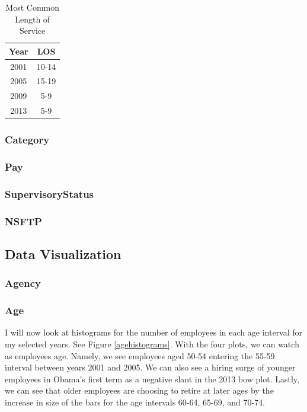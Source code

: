 \documentclass{article}
\begin{document}
            \begin{center}
                \begin{table}
                    \centering
                    \begin{tabular}{ |c|c| }
                        \hline
                        Year & LOS \\
                        \hline
                        2001 & 10-14 \\
                        2005 & 15-19 \\
                        2009 & 5-9 \\
                        2013 & 5-9 \\
                        \hline
                    \end{tabular}
                    \caption{Most Common Length of Service}
                    \label{tab:10}
                \end{table}
            \end{center}

        \subsubsection{Category}

        \subsubsection{Pay}

        \subsubsection{SupervisoryStatus}

        \subsubsection{NSFTP}

    \subsection{Data Visualization}

        \subsubsection{Agency}

        \subsubsection{Age}
        I will now look at histograms for the number of employees in each age interval for my selected years. See Figure \ref{agehistograms}. With the four plots, we can watch as employees age. Namely, we see employees aged 50-54 entering the 55-59 interval between years 2001 and 2005. We can also see a hiring surge of younger employees in Obama's first term as a negative slant in the 2013 bow plot. Lastly, we can see that older employees are choosing to retire at later ages by the increase in size of the bars for the age intervals 60-64, 65-69, and 70-74.
\end{document}
